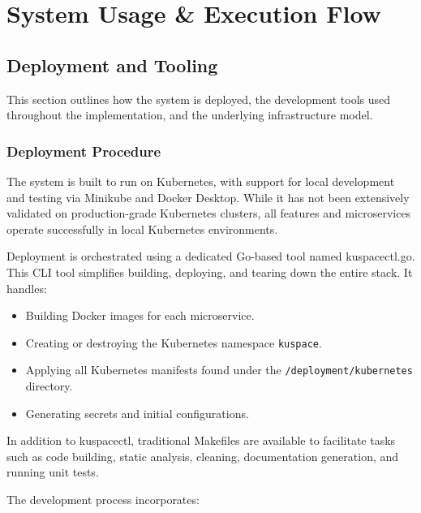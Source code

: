 \chapter{System Usage \& Execution Flow}
\section{Deployment and Tooling}

This section outlines how the system is deployed, the development tools used 
throughout the implementation, and the underlying infrastructure model.

\subsection{Deployment Procedure}

The system is built to run on Kubernetes, with support for local development and testing via Minikube and Docker Desktop. While it has not been extensively validated on production-grade Kubernetes clusters, all features and microservices operate successfully in local Kubernetes environments.

Deployment is orchestrated using a dedicated Go-based tool named kuspacectl.go. This CLI tool simplifies building, deploying, and tearing down the entire stack. It handles:

\begin{itemize}
\item Building Docker images for each microservice.
\item Creating or destroying the Kubernetes namespace \texttt{kuspace}.
\item Applying all Kubernetes manifests found under the 
\texttt{/deployment/kubernetes} directory.
\item Generating secrets and initial configurations.
\end{itemize}

In addition to kuspacectl, traditional Makefiles are available to facilitate tasks such as code building, static analysis, cleaning, documentation generation, and running unit tests.

The development process incorporates:

